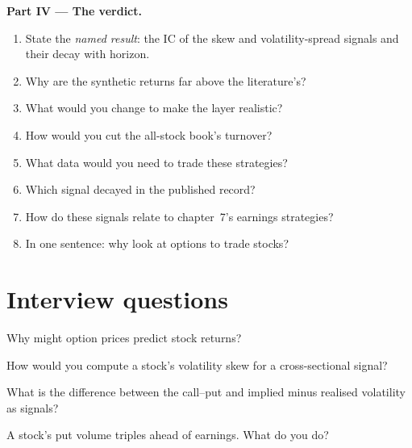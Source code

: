 \begin{problem}
\medskip\noindent\textbf{Part IV --- The verdict.}
\begin{enumerate}[resume]
\item State the \emph{named result}: the IC of the skew and volatility-spread signals and their decay with horizon.
\item Why are the synthetic returns far above the literature's?
\item What would you change to make the layer realistic?
\item How would you cut the all-stock book's turnover?
\item What data would you need to trade these strategies?
\item Which signal decayed in the published record?
\item How do these signals relate to chapter~7's earnings strategies?
\item In one sentence: why look at options to trade stocks?
\end{enumerate}
\end{problem}

\section{Interview questions}

\begin{interviewq}\label{iq:s1:options-implied-signals-for-stocks:1}
Why might option prices predict stock returns?
\end{interviewq}

\begin{interviewq}\label{iq:s1:options-implied-signals-for-stocks:2}
How would you compute a stock's volatility skew for a cross-sectional signal?
\end{interviewq}

\begin{interviewq}\label{iq:s1:options-implied-signals-for-stocks:3}
What is the difference between the call--put  and implied minus realised volatility as signals?
\end{interviewq}

\begin{interviewq}\label{iq:s1:options-implied-signals-for-stocks:4}
A stock's put volume triples ahead of earnings. What do you do?
\end{interviewq}

